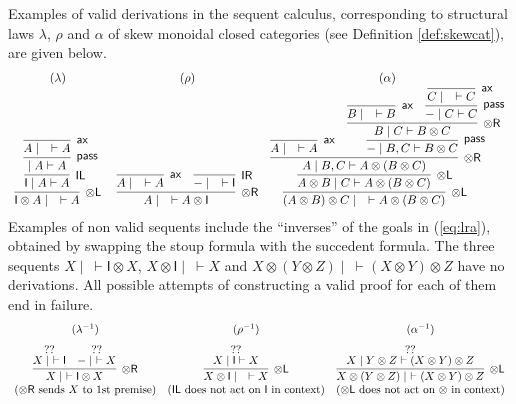 \documentclass[submission,copyright,creativecommons]{eptcs}
\theoremstyle{definition}
\newcommand{\tl}{\otimes \mathsf{L}}
\newcommand{\tr}{\otimes \mathsf{R}}
\newcommand{\pass}{\mathsf{pass}}
\newcommand{\unitl}{\mathsf{IL}}
\newcommand{\unitr}{\mathsf{IR}}
\newcommand{\ax}{\mathsf{ax}}
\newcommand{\ot}{\otimes}
\newcommand{\I}{\mathsf{I}}
\begin{document}
Examples of valid derivations in the sequent calculus, corresponding to structural laws $\lambda$, $\rho$ and $\alpha$ of skew monoidal closed categories (see Definition \ref{def:skewcat}), are given below. %
\begin{equation}\label{eq:lra}
  \begin{array}{c@{\;\quad}cc}
  (\lambda) & (\rho) & (\alpha) \\
  \infer[\tl]{\I \ot A \mid \quad \vdash A}{
    \infer[\unitl]{\I \mid A \vdash A}{
      \infer[\pass]{ \mid A \vdash A}{
        \infer[\ax]{A \mid \quad \vdash A}{}
      }
    }
  }
  &
  \infer[\tr]{A \mid \quad \vdash A \ot \I}{
    \infer[\ax]{A \mid \quad \vdash A}{}
    &
    \infer[\unitr]{- \mid \quad \vdash \I}{}
  }
  &
  \infer[\tl]{(A \ot B) \ot C \mid \quad \vdash A \ot (B \ot C)}{
    \infer[\tl]{A \ot B \mid C \vdash A \ot (B \ot C)}{
      \infer[\tr]{A \mid B , C \vdash A \ot (B \ot C)}{
        \infer[\ax]{A \mid \quad \vdash A}{}
        &
        \infer[\pass]{- \mid B , C \vdash B \ot C}{
          \infer[\tr]{B \mid C \vdash B \ot C}{
            \infer[\ax]{B \mid \quad \vdash B}{}
            &
            \infer[\pass]{- \mid C \vdash C}{
              \infer[\ax]{C \mid \quad \vdash C}{}
            }
          }
        }
      }
    }
  }
  \end{array}
\end{equation}
Examples of non valid sequents include the ``inverses'' of the goals in (\ref{eq:lra}), obtained by swapping the stoup formula with the succedent formula.
The three sequents $X \mid ~ \vdash \I \ot X$, $X \ot \I \mid ~ \vdash X$ and $X \ot (Y \ot Z) \mid ~ \vdash (X \ot Y) \ot Z$ have no derivations. All possible attempts of constructing a valid proof for each of them end in failure.
\begin{displaymath}
  \begin{array}{ccc}
  (\lambda^{-1}) & (\rho^{-1}) & (\alpha^{-1}) \\[6pt]
    \infer[\tr]{X \mid ~\vdash \I \ot X}{
      \deduce[??]{X \mid ~ \vdash \I}{
      }
      &
      \deduce[??]{- \mid ~ \vdash X}{
      }
    }
    &
    \infer[\tl]{X \ot \I \mid \quad \vdash X}{
      \deduce{X \mid \I \vdash X}{??}
    }
    &
    \infer[\tl]{X \ot (Y \ot Z) \mid ~\vdash (X \ot Y) \ot Z}{
      \deduce{X \mid Y \ot Z \vdash (X \ot Y) \ot Z}{??}
    } \\
    (\text{$\tr$ sends $X$ to 1st premise}) &
    (\text{$\unitl$ does not act on $\I$ in context}) &
    (\text{$\tl$ does not act on $\ot$ in context})
  \end{array}
\end{displaymath}
\end{document}
